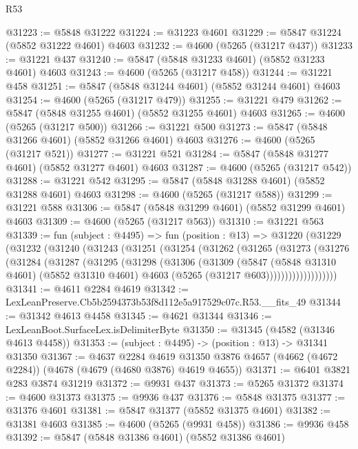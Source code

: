\begin{lexlean}{R53}
\begin{coremodule}
@31223 := @5848 @31222
@31224 := @31223 @4601
@31229 := @5847 @31224 (@5852 @31222 @4601) @4603
@31232 := @4600 (@5265 (@31217 @437))
@31233 := @31221 @437
@31240 := @5847 (@5848 @31233 @4601) (@5852 @31233 @4601) @4603
@31243 := @4600 (@5265 (@31217 @458))
@31244 := @31221 @458
@31251 := @5847 (@5848 @31244 @4601) (@5852 @31244 @4601) @4603
@31254 := @4600 (@5265 (@31217 @479))
@31255 := @31221 @479
@31262 := @5847 (@5848 @31255 @4601) (@5852 @31255 @4601) @4603
@31265 := @4600 (@5265 (@31217 @500))
@31266 := @31221 @500
@31273 := @5847 (@5848 @31266 @4601) (@5852 @31266 @4601) @4603
@31276 := @4600 (@5265 (@31217 @521))
@31277 := @31221 @521
@31284 := @5847 (@5848 @31277 @4601) (@5852 @31277 @4601) @4603
@31287 := @4600 (@5265 (@31217 @542))
@31288 := @31221 @542
@31295 := @5847 (@5848 @31288 @4601) (@5852 @31288 @4601) @4603
@31298 := @4600 (@5265 (@31217 @588))
@31299 := @31221 @588
@31306 := @5847 (@5848 @31299 @4601) (@5852 @31299 @4601) @4603
@31309 := @4600 (@5265 (@31217 @563))
@31310 := @31221 @563
@31339 := fun (subject : @4495) =>
  fun (position : @13) =>
  @31220
    (@31229
      (@31232
        (@31240
          (@31243
            (@31251
              (@31254
                (@31262
                  (@31265
                    (@31273
                      (@31276
                        (@31284
                          (@31287
                            (@31295
                              (@31298
                                (@31306
                                  (@31309
                                    (@5847
                                      (@5848 @31310 @4601)
                                      (@5852 @31310 @4601)
                                      @4603
                                      (@5265 (@31217 @603)))))))))))))))))))
@31341 := @4611 @2284 @4619
@31342 := LexLeanPreserve.Cb5b2594373b53f8d112e5a917529c07c.R53.__fits_49
@31344 := @31342 @4613 @4458
@31345 := @4621 @31344
@31346 := LexLeanBoot.SurfaceLex.isDelimiterByte
@31350 := @31345 (@4582 (@31346 @4613 @4458))
@31353 := (subject : @4495) -> (position : @13) -> @31341 @31350
@31367 := @4637
    @2284
    @4619
    @31350
    @3876
    @4657
    (@4662 (@4672 @2284))
    (@4678 (@4679 (@4680 @3876) @4619 @4655))
@31371 := @6401 @3821 @283 @3874 @31219
@31372 := @9931 @437
@31373 := @5265 @31372
@31374 := @4600 @31373
@31375 := @9936 @437
@31376 := @5848 @31375
@31377 := @31376 @4601
@31381 := @5847 @31377 (@5852 @31375 @4601)
@31382 := @31381 @4603
@31385 := @4600 (@5265 (@9931 @458))
@31386 := @9936 @458
@31392 := @5847 (@5848 @31386 @4601) (@5852 @31386 @4601)

\end{coremodule}
\end{lexlean}
